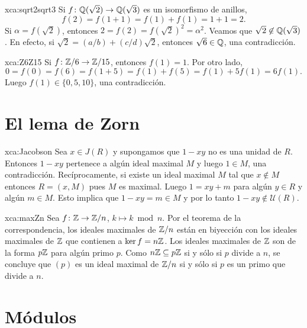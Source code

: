\begin{sol}{xca:sqrt2sqrt3}
 Si $f\colon\mathbb{Q}(\sqrt{2})\to\mathbb{Q}(\sqrt{3})$ es un isomorfismo de anillos,
 \[
 f(2)=f(1+1)=f(1)+f(1)=1+1=2.
 \] 
 Si $\alpha=f(\sqrt{2})$, entonces $2=f(2)=f(\sqrt{2})^2=\alpha^2$. Veamos
 que $\sqrt{2}\not\in\mathbb{Q}(\sqrt{3})$. En efecto, si $\sqrt{2}=(a/b)+(c/d)\sqrt{2}$, entonces
 $\sqrt{6}\in\mathbb{Q}$, una contradicción.
\end{sol}

\begin{sol}{xca:Z6Z15}
 Si $f\colon\mathbb{Z}/6\to\mathbb{Z}/15$, entonces $f(1)=1$. Por otro lado,
 \[
 0=f(0)=f(6)=f(1+5)=f(1)+f(5)=f(1)+5f(1)=6f(1).
 \]
 Luego $f(1)\in\{0,5,10\}$, una contradicción.
\end{sol}

\section*{El lema de Zorn}

\begin{sol}{xca:Jacobson}
    Sea $x\in J(R)$ y supongamos que $1-xy$ no
    es una unidad de $R$. Entonces $1-xy$ pertenece a algún ideal maximal $M$ y
    luego $1\in M$, una contradicción. Recíprocamente, si existe
    un ideal maximal $M$ tal que $x\not\in M$ entonces $R=(x,M)$ pues $M$ es
    maximal. Luego $1=xy+m$ para algún $y\in R$ y algún $m\in M$. Esto implica que
    $1-xy=m\in M$ y por lo tanto $1-xy\not\in\mathcal{U}(R)$. 
\end{sol}

\begin{sol}{xca:maxZn}
Sea $f\colon\mathbb{Z}\to \mathbb{Z}/n$, $k\mapsto k\bmod n$. Por el teorema de la correspondencia, los ideales
maximales de $\mathbb{Z}/n$ están en biyección con los ideales maximales de $\mathbb{Z}$ que contienen a $\ker f=n\mathbb{Z}$. 
Los ideales maximales de $\mathbb{Z}$ son de la forma $p\mathbb{Z}$ para algún primo $p$. 
Como $n\mathbb{Z}\subseteq p\mathbb{Z}$ si y sólo si $p$ divide a $n$, se concluye que 
$(p)$ es un ideal maximal de $\mathbb{Z}/n$ si y sólo si $p$ es un primo que divide a $n$.  
\end{sol}

\section*{Módulos}

